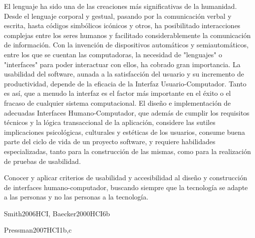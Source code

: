 \begin{syllabus}


\begin{justification}
	El lenguaje ha sido una de las creaciones más significativas de la humanidad. Desde el lenguaje corporal y gestual, pasando por la comunicación verbal y escrita, hasta códigos simbólicos icónicos y otros, ha posibilitado interacciones complejas entre los seres humanos y facilitado considerablemente la comunicación de información. Con la invención de dispositivos automáticos y semiautomáticos, entre los que se cuentan las computadoras, la necesidad de "lenguajes" o "interfaces" para poder interactuar con ellos, ha cobrado gran importancia.
	La usabilidad del software, aunada a la satisfacción del usuario y su incremento de productividad, depende de la eficacia de la Interfaz Usuario-Computador. Tanto es así, que a menudo la interfaz es el factor más importante en el éxito o el fracaso de cualquier sistema computacional.
	El diseño e implementación de adecuadas Interfaces Humano-Computador, que además de cumplir los requisitos técnicos y la lógica transaccional de la aplicación, considere las sutiles implicaciones psicológicas, culturales y estéticas de los usuarios, consume buena parte del ciclo de vida de un proyecto software, y requiere habilidades especializadas, tanto para la construcción de las mismas, como para la realización de pruebas de usabilidad.
	\end{justification}
	
	\begin{goals}
	\item Conocer y aplicar criterios de usabilidad y accesibilidad al diseño y construcción de interfaces humano-computador, buscando siempre que la tecnología se adapte a las personas y no las personas a la tecnología.
	\end{goals}
	
	
	
	\begin{unit}{\HCIFoundations}{}{Smith2006HCI, Baecker2000HCI}{6}{b}
		\HCIFoundationsAllTopics
		\HCIFoundationsAllLearningOutcomes
	\end{unit}
	
	\begin{unit}{\PLObjectOrientedProgramming}{}{Pressman2007HCI}{1}{b,c}
		\PLObjectOrientedProgramming
	\end{unit}
	

\end{syllabus}
